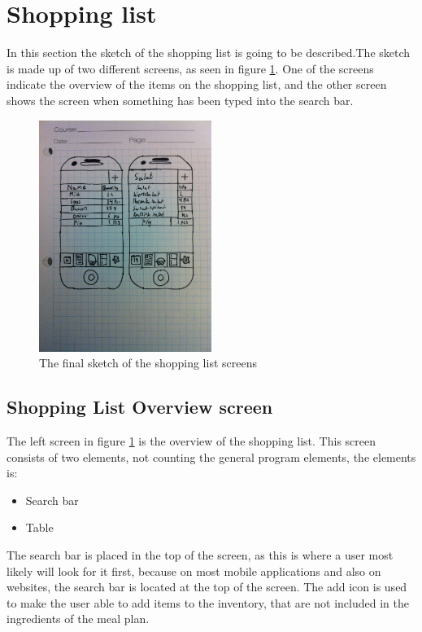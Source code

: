 \section{Shopping list}

In this section the sketch of the shopping list is going to be described.The sketch is made up of two different screens, as seen in figure \ref{FinalShoppingListSketch}. One of the screens indicate the overview of the items on the shopping list, and the other screen shows the screen when something has been typed into the search bar.

\begin{figure}[H]
    \centering
    \includegraphics[width=0.5\textwidth]{Grafik/FoodPlanner/FinalShoppingListSketch}
    \caption{The final sketch of the shopping list screens}
    \label{FinalShoppingListSketch}
\end{figure}

\subsection{Shopping List Overview screen}

The left screen in figure \ref{FinalShoppingListSketch} is the overview of the shopping list. This screen consists of two elements, not counting the general program elements, the elements is:

\begin{itemize}
	\item Search bar
	\item Table
\end{itemize}

The search bar is placed in the top of the screen, as this is where a user most likely will look for it first, because on most mobile applications and also on websites, the search bar is located at the top of the screen. The add icon is used to make the user able to add items to the inventory, that are not included in the ingredients of the meal plan.

